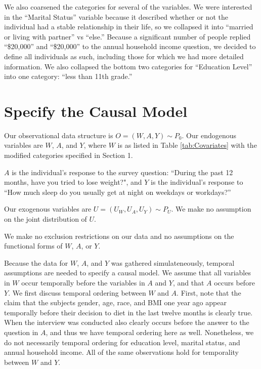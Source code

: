 \documentclass{article}
\begin{document}
We also coarsened the categories for several of the variables.  We were interested in the ``Marital Status'' variable because it described whether or not the individual had a stable relationship in their life, so we collapsed it into ``married or living with partner'' vs ``else.''  Because a significant number of people replied ``\$20,000'' and ``\$20,000'' to the annual household income question, we decided to define all individuals as such, including those for which we had more detailed information.  We also collapsed the bottom two categories for ``Education Level'' into one category: ``less than 11th grade.''

% 
% 

\section{Specify the Causal Model}

Our observational data structure is $O=(W,A,Y) \sim P_0$. Our endogenous variables are $W$, $A$, and $Y$, where $W$ is as listed in Table \ref{tab:Covariates} with the modified categories specified in Section 1.

$A$ is the individual's response to the survey question: ``During the past 12 months, have you tried to lose weight?", and $Y$ is the individual's response to ``How much sleep do you usually get at night on weekdays or workdays?''  

Our exogenous variables are $U = (U_W, U_A, U_Y) \sim P_U$. We make no assumption on the joint distribution of $U$.  

We make no exclusion restrictions on our data and no assumptions on the functional forms of $W$, $A$, or $Y$.

Because the data for $W$, $A$, and $Y$ was gathered simulateneously, temporal assumptions are needed to specify a causal model. We assume that all variables in $W$ occur temporally before the variables in $A$ and $Y$, and that $A$ occurs before $Y$. We first discuss temporal ordering between $W$ and $A$. First, note that the claim that the subjects gender, age, race, and BMI one year ago appear temporally before their decision to diet in the last twelve months is clearly true. When the interview was conducted also clearly occurs before the answer to the question in $A$, and thus we have temporal ordering here as well. Nonetheless, we do not necessarily temporal ordering for education level, marital status, and annual household income. All of the same observations hold for temporality between $W$ and $Y$.
\end{document}
